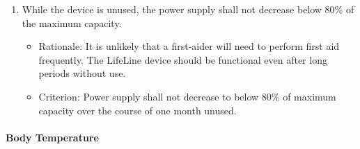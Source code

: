 \documentclass{article}
\begin{document}
\begin{enumerate}[label = \textbf{{FR}\arabic*}  ]
	   \item \label{power_2} While the device is unused, the power supply shall not decrease below 80\% of the maximum capacity.
	        \begin{itemize}
	            \item Rationale: It is unlikely that a first-aider will need to perform first aid frequently.  The LifeLine device should be functional even after long periods without use.   
	            \item Criterion: Power supply shall not decrease to below 80\% of maximum capacity over the course of one month unused. 
	        \end{itemize}
	        
        \end{enumerate}

        \paragraph{Body Temperature}
\end{document}
